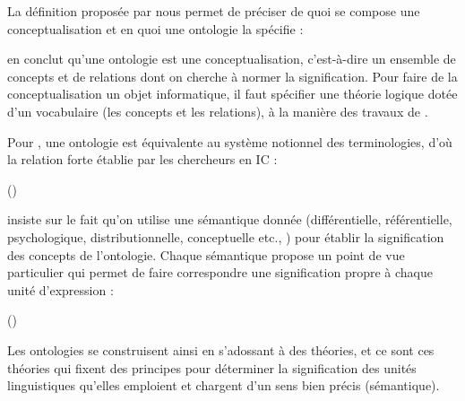  La définition proposée par \cite{Uschold1996} nous permet de préciser de quoi se compose une conceptualisation et en quoi une ontologie la spécifie : 


\citeauthor{Charlet2002} en conclut qu'une ontologie est une conceptualisation, c'est-à-dire un ensemble de concepts et de relations dont on cherche à normer la signification. 
Pour faire de la conceptualisation un objet informatique, il faut spécifier une théorie logique dotée d'un vocabulaire (les concepts et les relations), à la manière des travaux de \cite{Guarino1995}.

Pour \citeauthor{Roche2005}, une ontologie est équivalente au système notionnel des terminologies, d'où la relation forte établie par les chercheurs en IC : 

 (\cite{Roche2005})

\citeauthor{Bachimont2000a} insiste sur le fait qu'on utilise une sémantique donnée (différentielle, référentielle, psychologique, distributionnelle, conceptuelle etc., \cite{bachimont:hdr}) pour établir la signification des concepts de l'ontologie. Chaque sémantique propose un point de vue particulier qui permet de faire correspondre une signification propre à chaque unité d'expression : 

 (\cite{Bachimont2000a})

Les ontologies se construisent ainsi en s'adossant à des théories, et ce sont ces théories qui fixent des principes pour déterminer la signification des unités linguistiques qu'elles emploient et chargent d'un sens bien précis (sémantique). 

